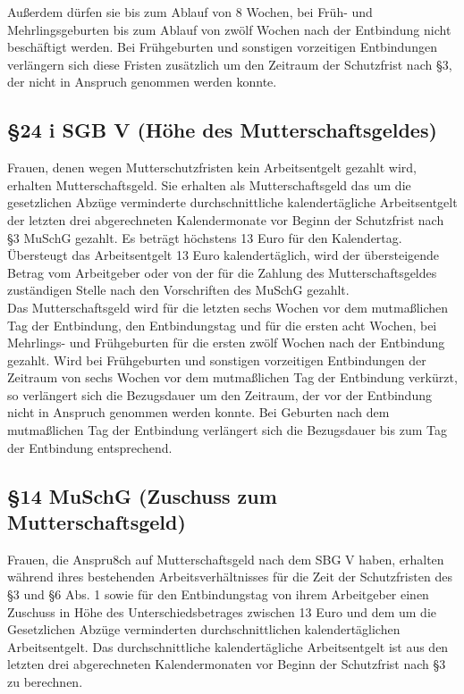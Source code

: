 \documentclass[a4paper, 12pt]{report}
\begin{document}
Außerdem dürfen sie bis zum Ablauf von 8 Wochen, bei Früh- und Mehrlingsgeburten
bis zum Ablauf von zwölf Wochen nach der Entbindung nicht beschäftigt werden. 
Bei Frühgeburten und sonstigen vorzeitigen Entbindungen verlängern sich diese 
Fristen zusätzlich um den Zeitraum der Schutzfrist nach \S 3, der nicht in 
Anspruch genommen werden konnte. 

\subsection{\S 24 i SGB V (Höhe des Mutterschaftsgeldes)}

Frauen, denen wegen Mutterschutzfristen kein Arbeitsentgelt gezahlt wird, 
erhalten Mutterschaftsgeld. Sie erhalten als Mutterschaftsgeld das um die 
gesetzlichen Abzüge verminderte durchschnittliche kalendertägliche 
Arbeitsentgelt der letzten drei abgerechneten Kalendermonate vor Beginn der 
Schutzfrist nach \S 3 MuSchG gezahlt. Es beträgt höchstens 13 Euro für den 
Kalendertag. Übersteugt das Arbeitsentgelt 13 Euro kalendertäglich, wird der 
übersteigende Betrag vom Arbeitgeber oder von der für die Zahlung des 
Mutterschaftsgeldes zuständigen Stelle nach den Vorschriften des MuSchG 
gezahlt. \\

Das Mutterschaftsgeld wird für die letzten sechs Wochen vor dem mutmaßlichen Tag
der Entbindung, den Entbindungstag und für die ersten acht Wochen, bei 
Mehrlings- und Frühgeburten für die ersten zwölf Wochen nach der Entbindung 
gezahlt. Wird bei Frühgeburten und sonstigen vorzeitigen Entbindungen der 
Zeitraum von sechs Wochen vor dem mutmaßlichen Tag der Entbindung verkürzt, so
verlängert sich die Bezugsdauer um den Zeitraum, der vor der Entbindung nicht in 
Anspruch genommen werden konnte. Bei Geburten nach dem mutmaßlichen Tag der 
Entbindung verlängert sich die Bezugsdauer bis zum Tag der Entbindung 
entsprechend. 

\subsection{\S 14 MuSchG (Zuschuss zum Mutterschaftsgeld)}

Frauen, die Anspru8ch auf Mutterschaftsgeld nach dem SBG V haben, erhalten 
während ihres bestehenden Arbeitsverhältnisses für die Zeit der Schutzfristen 
des \S 3 und \S 6 Abs. 1 sowie für den Entbindungstag von ihrem Arbeitgeber
einen Zuschuss in Höhe des Unterschiedsbetrages zwischen 13 Euro und dem um die 
Gesetzlichen Abzüge verminderten durchschnittlichen kalendertäglichen 
Arbeitsentgelt. Das durchschnittliche kalendertägliche Arbeitsentgelt ist aus 
den letzten drei abgerechneten Kalendermonaten vor Beginn der Schutzfrist nach 
\S 3 zu berechnen. \\
\end{document}
